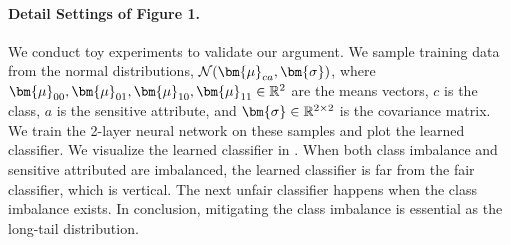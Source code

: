 \begin{table}[t]
\centering
\caption{CIFAR100-LT, ResNet32, ablation in terms of the number of additional data
}
    \label{tab:cifar100_lt_abl}
\end{table}






\paragraph{Detail Settings of Figure 1.}
We conduct toy experiments to validate our argument.
We sample training data from the normal distributions, $\calN(\bm{\mu}_{ca}, \bm{\sigma})$, where $\bm{\mu}_{00}, \bm{\mu}_{01}, \bm{\mu}_{10}, \bm{\mu}_{11} \in \Real^{2}$ are the means vectors, $c$ is the class, $a$ is the sensitive attribute, and $\bm{\sigma} \in \Real^{2\times 2}$ is the covariance matrix.
We train the 2-layer neural network on these samples and plot the learned classifier.
We visualize the learned classifier in .
When both class imbalance and sensitive attributed are imbalanced, the learned classifier is far from the fair classifier, which is vertical.
The next unfair classifier happens when the class imbalance exists.
In conclusion, mitigating the class imbalance is essential as the long-tail distribution.

